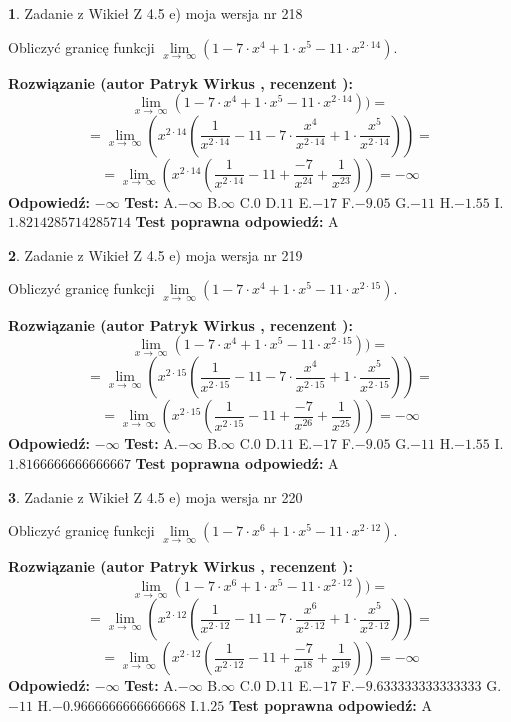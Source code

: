 \documentclass[12pt, a4paper]{article}
\theoremstyle{definition} %
\newtheorem{zad}{}
\newcommand{\zadStart}[1]{\begin{zad}#1\newline}
\newcommand{\zadStop}{\end{zad}}
\newcommand{\rozwStart}[2]{\noindent \textbf{Rozwiązanie (autor #1 , recenzent #2): }\newline}
\newcommand{\rozwStop}{\newline}
\newcommand{\odpStart}{\noindent \textbf{Odpowiedź:}\newline}
\newcommand{\odpStop}{\newline}
\newcommand{\testStart}{\noindent \textbf{Test:}\newline}
\newcommand{\testStop}{\newline}
\newcommand{\kluczStart}{\noindent \textbf{Test poprawna odpowiedź:}\newline}
\newcommand{\kluczStop}{\newline}
\begin{document}
\zadStart{Zadanie z Wikieł Z 4.5 e) moja wersja nr 218}


Obliczyć granicę funkcji  $\lim\limits_{x\to\ \infty}(1 - 7 \cdot x^{4}+1 \cdot x^{5}- 11 \cdot x^{2\cdot14})$.
\zadStop
\rozwStart{Patryk Wirkus}{}
$$\lim\limits_{x\to\ \infty}(1 - 7 \cdot x^{4}+1 \cdot x^{5}- 11 \cdot x^{2\cdot14}))=$$
$$=\lim\limits_{x\to\ \infty}(x^{2\cdot14}(\frac{1}{x^{2\cdot14}}-11 -7 \cdot \frac{x^{4}}{x^{2\cdot14}}+1 \cdot \frac{x^{5}}{x^{2\cdot14}}))=$$
$$=\lim\limits_{x\to\ \infty}(x^{2\cdot14}(\frac{1}{x^{2\cdot14}}-11 + \frac{-7}{x^{24}}+ \frac{1}{x^{23}}))=-\infty$$
\rozwStop
\odpStart
$-\infty$
\odpStop
\testStart
A.$-\infty$ B.$\infty$ C.$0$ D.$11$ E.$-17$
F.$-9.05$ G.$-11$
H.$-1.55$
I.$1.8214285714285714$
\testStop
\kluczStart
A
\kluczStop



\zadStart{Zadanie z Wikieł Z 4.5 e) moja wersja nr 219}


Obliczyć granicę funkcji  $\lim\limits_{x\to\ \infty}(1 - 7 \cdot x^{4}+1 \cdot x^{5}- 11 \cdot x^{2\cdot15})$.
\zadStop
\rozwStart{Patryk Wirkus}{}
$$\lim\limits_{x\to\ \infty}(1 - 7 \cdot x^{4}+1 \cdot x^{5}- 11 \cdot x^{2\cdot15}))=$$
$$=\lim\limits_{x\to\ \infty}(x^{2\cdot15}(\frac{1}{x^{2\cdot15}}-11 -7 \cdot \frac{x^{4}}{x^{2\cdot15}}+1 \cdot \frac{x^{5}}{x^{2\cdot15}}))=$$
$$=\lim\limits_{x\to\ \infty}(x^{2\cdot15}(\frac{1}{x^{2\cdot15}}-11 + \frac{-7}{x^{26}}+ \frac{1}{x^{25}}))=-\infty$$
\rozwStop
\odpStart
$-\infty$
\odpStop
\testStart
A.$-\infty$ B.$\infty$ C.$0$ D.$11$ E.$-17$
F.$-9.05$ G.$-11$
H.$-1.55$
I.$1.8166666666666667$
\testStop
\kluczStart
A
\kluczStop



\zadStart{Zadanie z Wikieł Z 4.5 e) moja wersja nr 220}


Obliczyć granicę funkcji  $\lim\limits_{x\to\ \infty}(1 - 7 \cdot x^{6}+1 \cdot x^{5}- 11 \cdot x^{2\cdot12})$.
\zadStop
\rozwStart{Patryk Wirkus}{}
$$\lim\limits_{x\to\ \infty}(1 - 7 \cdot x^{6}+1 \cdot x^{5}- 11 \cdot x^{2\cdot12}))=$$
$$=\lim\limits_{x\to\ \infty}(x^{2\cdot12}(\frac{1}{x^{2\cdot12}}-11 -7 \cdot \frac{x^{6}}{x^{2\cdot12}}+1 \cdot \frac{x^{5}}{x^{2\cdot12}}))=$$
$$=\lim\limits_{x\to\ \infty}(x^{2\cdot12}(\frac{1}{x^{2\cdot12}}-11 + \frac{-7}{x^{18}}+ \frac{1}{x^{19}}))=-\infty$$
\rozwStop
\odpStart
$-\infty$
\odpStop
\testStart
A.$-\infty$ B.$\infty$ C.$0$ D.$11$ E.$-17$
F.$-9.633333333333333$ G.$-11$
H.$-0.9666666666666668$
I.$1.25$
\testStop
\kluczStart
A
\kluczStop
\end{document}

